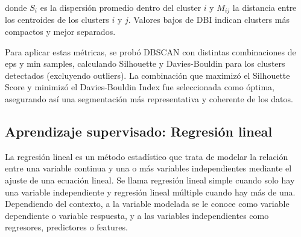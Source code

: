 \documentclass{article}
\begin{document}
donde $S_i$ es la dispersión promedio dentro del cluster $i$ y $M_{ij}$ la distancia entre los centroides de los clusters $i$ y $j$. Valores bajos de DBI indican clusters más compactos y mejor separados.

Para aplicar estas métricas, se probó DBSCAN con distintas combinaciones de eps y min samples, calculando Silhouette y Davies-Bouldin para los clusters detectados (excluyendo outliers). La combinación que maximizó el Silhouette Score y minimizó el Davies-Bouldin Index fue seleccionada como óptima, asegurando así una segmentación más representativa y coherente de los datos.

\subsection{Aprendizaje supervisado: Regresión lineal}

La regresión lineal es un método estadístico que trata de modelar la relación entre una variable continua y una o más variables independientes mediante el ajuste de una ecuación lineal. Se llama regresión lineal simple cuando solo hay una variable independiente y regresión lineal múltiple cuando hay más de una. Dependiendo del contexto, a la variable modelada se le conoce como variable dependiente o variable respuesta, y a las variables independientes como regresores, predictores o features.\cite{ciencia_datos_net}  \\
\end{document}

